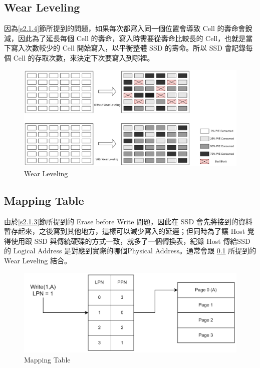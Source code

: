 \subsection{Wear Leveling}\label{s2.2.1}
\indent
因為\ref{s2.1.4}節所提到的問題，如果每次都寫入同一個位置會導致 Cell 的壽命會銳減，因此為了延長每個 Cell 的壽命，寫入時需要從壽命比較長的 Cell，也就是當下寫入次數較少的 Cell 開始寫入，以平衡整體 SSD 的壽命。所以 SSD 會記錄每個 Cell 的存取次數，來決定下次要寫入到哪裡。\cite{Wear_Leveling_Thesis}
\begin{figure}[H]
    \centering
    \includegraphics[width=1\textwidth]{picture/ch2/Wear_Leveling.png}
    \caption{Wear Leveling\cite{Wear_Leveling_Pic}}
    \label{f2.5}
\end{figure}

\subsection{Mapping Table}\label{s2.2.2}
\indent
由於\ref{s2.1.3}節所提到的 Erase before Write 問題，因此在 SSD 會先將接到的資料暫存起來，之後寫到其他地方，這樣可以減少寫入的延遲；但同時為了讓 Host 覺得使用跟 SSD 與傳統硬碟的方式一致，就多了一個轉換表，紀錄 Host 傳給SSD的 Logical Address 是對應到實際的哪個Physical Address。通常會跟 \ref{s2.2.1} 所提到的 Wear Leveling 結合。
\begin{figure}[H]
    \centering
    \includegraphics[width=1\textwidth]{picture/ch2/mapping_table.png}
    \caption{Mapping Table\cite{Mapping_Table}}
    \label{f2.6}
\end{figure}


